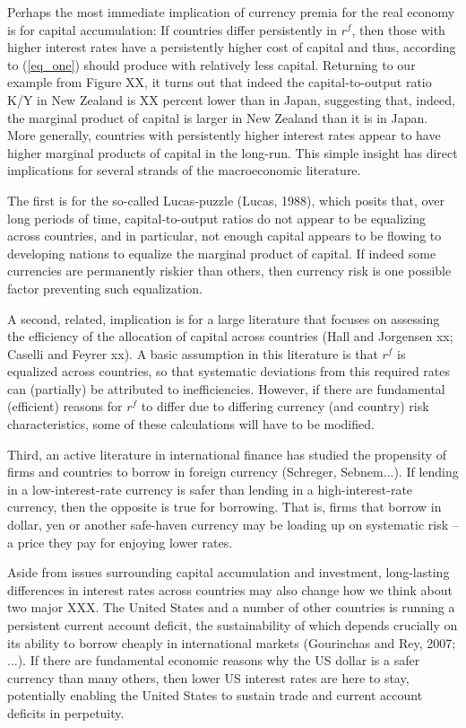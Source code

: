 \documentclass[12pt,letter]{article}
\theoremstyle{break} \theorembodyfont{\normalfont\itshape}
\theoremstyle{break}
\theoremstyle{break} \theorembodyfont{\normalfont\itshape}
\theoremstyle{break} \theorembodyfont{\normalfont\itshape}
\begin{document}
Perhaps the most immediate implication of currency premia for the real
economy is for capital accumulation: If countries differ persistently
in $r^f$, then those with higher interest rates have a persistently
higher cost of capital and thus, according to (\ref{eq_one}) should
produce with relatively less capital. Returning to our example from
Figure XX, it turns out that indeed the capital-to-output ratio K/Y in
New Zealand is XX percent lower than in Japan, suggesting that,
indeed, the marginal product of capital is larger in New Zealand than
it is in Japan. More generally, countries with persistently higher
interest rates appear to have higher marginal products of capital in
the long-run. This simple insight has direct implications for several
strands of the macroeconomic literature.

The first is for the so-called Lucas-puzzle (Lucas, 1988), which
posits that, over long periods of time, capital-to-output ratios do not appear to be equalizing across countries, and in particular, not enough capital appears to be flowing to developing nations to equalize the marginal product of capital. If indeed some currencies are permanently riskier than others, then currency risk is one possible factor preventing such equalization.

A second, related, implication is for a large literature that focuses on assessing the efficiency of the allocation of capital across countries (Hall and Jorgensen xx; Caselli and Feyrer xx). A basic assumption in this literature is that $r^f$ is equalized across countries, so that systematic deviations from this required rates can (partially) be attributed to inefficiencies. However, if there are fundamental (efficient) reasons for $r^f$ to differ due to differing currency (and country) risk characteristics, some of these calculations will have to be modified.

Third, an active literature in international finance has studied the propensity of firms and countries to borrow in foreign currency (Schreger, Sebnem...). If lending in a low-interest-rate currency is safer than lending in a high-interest-rate currency, then the opposite is true for borrowing. That is, firms that borrow in dollar, yen or another safe-haven currency may be loading up on systematic risk -- a price they pay for enjoying lower rates.

Aside from issues surrounding capital accumulation and investment, long-lasting differences in interest rates across countries may also change how we think about two major XXX. The United States and a number of other countries is running a persistent current account deficit, the sustainability of which depends crucially on its ability to borrow cheaply in international markets (Gourinchas and Rey, 2007; ...). If there are fundamental economic reasons why the US dollar is a safer currency than many others, then lower US interest rates are here to stay, potentially enabling the United States to sustain trade and current account deficits in perpetuity.
\end{document}
